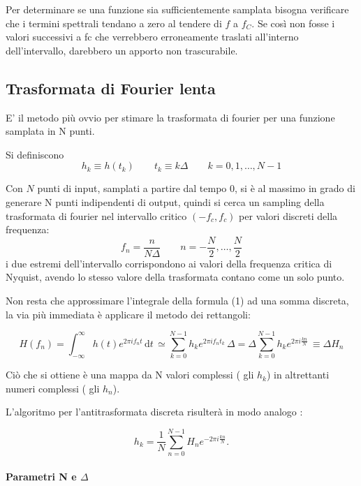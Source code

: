 \documentclass[13pt]{article}
\begin{document}
Per determinare se una funzione sia sufficientemente samplata  bisogna verificare che i termini spettrali tendano a zero al tendere di $f$ a $f_{C}$. Se così non fosse i valori successivi a fc che verrebbero erroneamente traslati all'interno dell'intervallo, darebbero un apporto non trascurabile.




\subsection{Trasformata di Fourier lenta}

E' il metodo più ovvio per stimare la trasformata di fourier per una funzione samplata in N punti.

Si definiscono $$ h_{k} \equiv h(t_{k}) \qquad t_{k} \equiv k \Delta \qquad k = 0,1, \ldots , N-1 $$

Con $ N$ punti di input, samplati a partire dal tempo 0, si è al massimo in grado di generare N punti indipendenti di output, quindi si cerca un sampling della trasformata di fourier nel intervallo critico $( - f_{c} , f_{c} ) $ per valori discreti della frequenza:
$$ f_{n} = \dfrac{n}{N \Delta} \qquad n = -\frac{N}{2} , \ldots , \frac{N}{2}$$
i due estremi dell'intervallo corrispondono ai valori della frequenza critica di Nyquist, avendo lo stesso valore della trasformata contano come un solo punto.

Non resta che approssimare l'integrale della formula (1) ad una somma discreta, la via più immediata è applicare il metodo dei rettangoli:

	\begin{equation}
	H(f_{n}) = \int_{-\infty}^{\infty} h(t) e^{2 \pi  i  f_{n}  t}\, \textrm{d} t \, \simeq 
	\sum_{k = 0}^{N - 1} h_{k} e^{2 \pi  i  f_{n}  t_{k}} \, \Delta = \Delta \sum_{k = 0}^{N - 1} h_{k} e^{2 \pi i \frac{k n}{N}} \, \equiv \Delta H_{n}
	\end{equation}

Ciò che si ottiene è una mappa da N valori complessi ( gli $h_{k}$) in altrettanti numeri complessi ( gli $h_{n}$).

L'algoritmo per l'antitrasformata discreta risulterà in modo analogo :

	\begin{equation}
	h_{k} = \frac{1}{N}\sum_{n = 0}^{N - 1} H_{n} e^{-2 \pi i \frac{k n}{N}}.
	\end{equation}

\paragraph{Parametri N e $\Delta$} 
\end{document}
